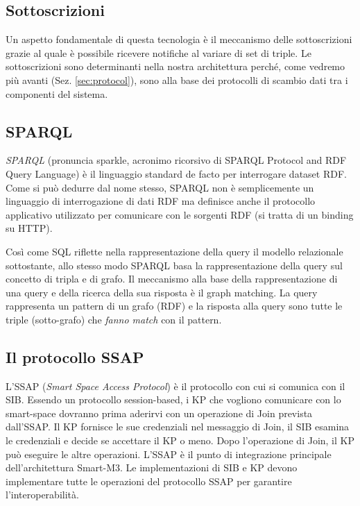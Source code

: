 \subsection{Sottoscrizioni}

Un aspetto fondamentale di questa tecnologia è il meccanismo delle sottoscrizioni grazie al quale è possibile ricevere notifiche al variare di set di triple. Le sottoscrizioni sono determinanti nella nostra architettura perché, come vedremo più avanti (Sez. \ref{sec:protocol}), sono alla base dei protocolli di scambio dati tra i componenti del sistema.

\subsection{SPARQL}

\emph{SPARQL}  (pronuncia sparkle, acronimo ricorsivo di SPARQL Protocol and RDF Query Language) è il linguaggio standard de facto per interrogare dataset RDF. Come si può dedurre dal nome stesso, SPARQL non è semplicemente un linguaggio di interrogazione di dati RDF ma definisce anche il protocollo applicativo utilizzato per comunicare con le sorgenti RDF (si tratta di un binding su HTTP).

Così come SQL riflette nella rappresentazione della query il modello relazionale sottostante, allo stesso modo SPARQL basa la rappresentazione della query sul concetto di tripla e di grafo. Il meccanismo alla base della rappresentazione di una query e della ricerca della sua risposta è il graph matching. La query rappresenta un pattern di un grafo (RDF) e la risposta alla query sono tutte le triple (sotto-grafo) che \emph{fanno match} con il pattern.

\subsection{Il protocollo SSAP}

L'SSAP (\emph{Smart Space Access Protocol}) è il protocollo con cui si comunica con il SIB. Essendo un protocollo session-based, i KP che vogliono comunicare con lo smart-space dovranno prima aderirvi con un operazione di Join prevista dall'SSAP. Il KP fornisce le sue credenziali nel messaggio di Join, il SIB esamina le credenziali e decide se accettare il KP o meno. Dopo l'operazione di Join, il KP può eseguire le altre operazioni. 
L'SSAP è il punto di integrazione principale dell'architettura Smart-M3. Le implementazioni di SIB e KP devono implementare tutte le operazioni del protocollo SSAP per garantire l'interoperabilità.

